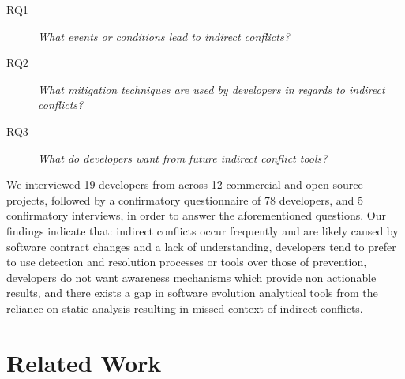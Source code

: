 \documentclass[conference]{IEEEtran}
\makeatletter
\def\namedlabel#1#2{\begingroup
   \def\@currentlabel{#2}%
   \label{#1}\endgroup
}
\makeatother
\begin{document}
\begin{description}
	\item[RQ1\namedlabel{itm:rq1}{RQ1}] \textit{What events or conditions lead to indirect conflicts?}
	\item[RQ2\namedlabel{itm:rq2}{RQ2}] \textit{What mitigation techniques are used by developers in regards to indirect conflicts?}
	\item[RQ3\namedlabel{itm:rq3}{RQ3}] \textit{What do developers want from future indirect conflict tools?}
\end{description}

We interviewed 19 developers from across 12 commercial and open source projects, followed by a confirmatory questionnaire of 78
developers, and 5 confirmatory interviews, in order to answer the aforementioned questions. Our findings indicate that:
indirect conflicts occur frequently and are likely caused by software contract changes and a lack of understanding,
developers tend to prefer to use detection and resolution processes or tools
over those of prevention, developers do not want awareness mechanisms which provide non actionable results,
and there exists a gap in software evolution analytical tools from the reliance on static analysis resulting in missed
context of indirect conflicts.

\section{Related Work}
\label{sec:related}
\end{document}
